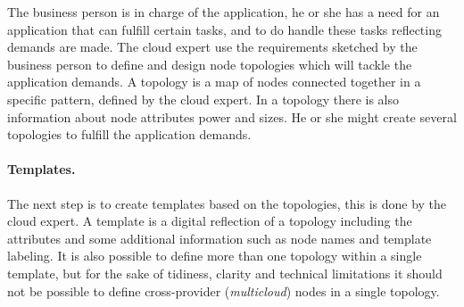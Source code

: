 The business person is in charge of the application, he or she has a need
for an application that can fulfill certain tasks, and to do handle these 
tasks reflecting demands are made.
The cloud expert use the requirements sketched by the business person to 
define and design node topologies which will tackle the application demands.
A topology is a map of nodes connected together in a specific pattern, 
defined by the cloud expert.
In a topology there is also information about node attributes 
\eg {} power and  sizes.
He or she might create several topologies to fulfill the application demands.

\paragraph{Templates.}

The next step is to create templates based on the topologies, this is done by
the cloud expert.
A template is a digital reflection of a topology including the attributes and some additional 
information such as node names and template labeling.
It is also possible to define more than one topology within a single template,
but for the sake of tidiness, clarity and technical limitations it 
should not be possible to define cross-provider (\emph{multicloud}) nodes in a single topology.
